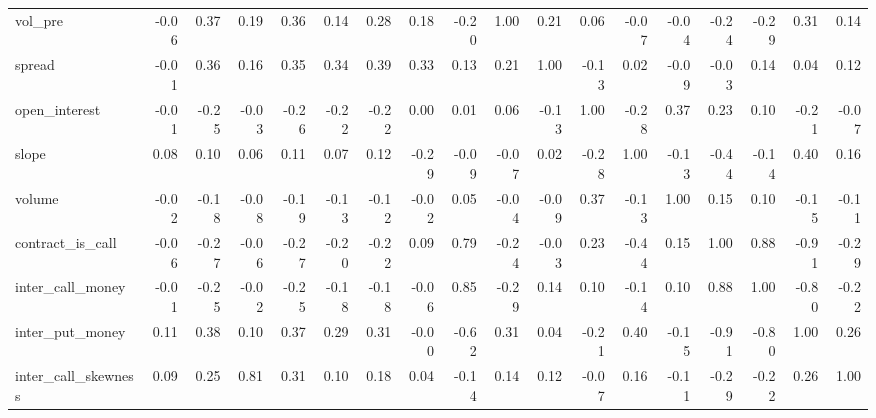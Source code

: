 \begin{tabular}{lrrrrrrrrrrrrrrrrr}
vol\_pre             &    -0.06 &        0.37 &      0.19 &    0.36 &          0.14 &        0.28 &  0.18 &    -0.20 &     1.00 &    0.21 &           0.06 &  -0.07 &   -0.04 &             -0.24 &             -0.29 &             0.31 &                 0.14 \\
spread              &    -0.01 &        0.36 &      0.16 &    0.35 &          0.34 &        0.39 &  0.33 &     0.13 &     0.21 &    1.00 &          -0.13 &   0.02 &   -0.09 &             -0.03 &              0.14 &             0.04 &                 0.12 \\
open\_interest       &    -0.01 &       -0.25 &     -0.03 &   -0.26 &         -0.22 &       -0.22 &  0.00 &     0.01 &     0.06 &   -0.13 &           1.00 &  -0.28 &    0.37 &              0.23 &              0.10 &            -0.21 &                -0.07 \\
slope               &     0.08 &        0.10 &      0.06 &    0.11 &          0.07 &        0.12 & -0.29 &    -0.09 &    -0.07 &    0.02 &          -0.28 &   1.00 &   -0.13 &             -0.44 &             -0.14 &             0.40 &                 0.16 \\
volume              &    -0.02 &       -0.18 &     -0.08 &   -0.19 &         -0.13 &       -0.12 & -0.02 &     0.05 &    -0.04 &   -0.09 &           0.37 &  -0.13 &    1.00 &              0.15 &              0.10 &            -0.15 &                -0.11 \\
contract\_is\_call    &    -0.06 &       -0.27 &     -0.06 &   -0.27 &         -0.20 &       -0.22 &  0.09 &     0.79 &    -0.24 &   -0.03 &           0.23 &  -0.44 &    0.15 &              1.00 &              0.88 &            -0.91 &                -0.29 \\
inter\_call\_money    &    -0.01 &       -0.25 &     -0.02 &   -0.25 &         -0.18 &       -0.18 & -0.06 &     0.85 &    -0.29 &    0.14 &           0.10 &  -0.14 &    0.10 &              0.88 &              1.00 &            -0.80 &                -0.22 \\
inter\_put\_money     &     0.11 &        0.38 &      0.10 &    0.37 &          0.29 &        0.31 & -0.00 &    -0.62 &     0.31 &    0.04 &          -0.21 &   0.40 &   -0.15 &             -0.91 &             -0.80 &             1.00 &                 0.26 \\
inter\_call\_skewness &     0.09 &        0.25 &      0.81 &    0.31 &          0.10 &        0.18 &  0.04 &    -0.14 &     0.14 &    0.12 &          -0.07 &   0.16 &   -0.11 &             -0.29 &             -0.22 &             0.26 &                 1.00 \\
\bottomrule
\end{tabular}
